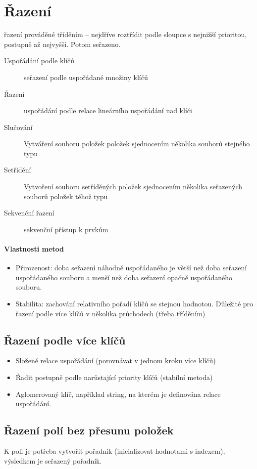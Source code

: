 \documentclass[a4paper, 11pt]{report}
\begin{document}
\section{Řazení}
řazení prováděné tříděním -- nejdříve roztřídit podle sloupce s nejnižší prioritou, postupně až nejvyšší. Potom seřazeno.

\begin{description}
	\item[Uspořádání podle klíčů] seřazení podle uspořádané množiny klíčů
	\item[Řazení] uspořádání podle relace lineárního uspořádání nad klíči
	\item[Slučování] Vytváření souboru položek položek sjednocením několika souborů stejného typu
	\item[Setřídění] Vytvoření souboru setříděných položek sjednocením několika seřazených souborů položek téhož typu
	\item[Sekvenční řazení] sekvenční přístup k prvkům
\end{description}

\paragraph{Vlastnosti metod}
\begin{itemize}
	\item Přirozenost: doba seřazení náhodně uspořádaného je větší než doba seřazení uspořádaného souboru a menší než doba seřazení opačně uspořádaného souboru.
	\item Stabilita: zachování relativního pořadí klíčů se stejnou hodnotou. Důležité pro řazení podle více klíčů v několika průchodech (třeba tříděním)
\end{itemize}

\subsection{Řazení podle více klíčů}
\begin{itemize}
	\item Složené relace uspořádání (porovnávat v jednom kroku více klíčů)
	\item Řadit postupně podle narůstající priority klíčů (stabilní metoda)
	\item Aglomerovaný klíč, například string, na kterém je definována relace uspořádání.
\end{itemize}

\subsection{Řazení polí bez přesunu položek}
K poli je potřeba vytvořit pořadník (inicializovat hodnotami s indexem), výsledkem je seřazený pořadník.
\end{document}
